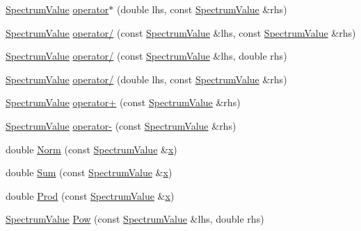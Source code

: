\begin{DoxyCompactItemize}
\hyperlink{classns3_1_1SpectrumValue}{Spectrum\+Value} \hyperlink{classns3_1_1SpectrumValue_a2dd636b84279c71ee85e995996810286}{operator$\ast$} (double lhs, const \hyperlink{classns3_1_1SpectrumValue}{Spectrum\+Value} \&rhs)
\item 
\hyperlink{classns3_1_1SpectrumValue}{Spectrum\+Value} \hyperlink{classns3_1_1SpectrumValue_a92ac3c987779b182821fd095f76c8666}{operator/} (const \hyperlink{classns3_1_1SpectrumValue}{Spectrum\+Value} \&lhs, const \hyperlink{classns3_1_1SpectrumValue}{Spectrum\+Value} \&rhs)
\item 
\hyperlink{classns3_1_1SpectrumValue}{Spectrum\+Value} \hyperlink{classns3_1_1SpectrumValue_a6186745351f66825c0bb43a963097bf4}{operator/} (const \hyperlink{classns3_1_1SpectrumValue}{Spectrum\+Value} \&lhs, double rhs)
\item 
\hyperlink{classns3_1_1SpectrumValue}{Spectrum\+Value} \hyperlink{classns3_1_1SpectrumValue_a82d8917d3c5a86202efb4f1ece6418ee}{operator/} (double lhs, const \hyperlink{classns3_1_1SpectrumValue}{Spectrum\+Value} \&rhs)
\item 
\hyperlink{classns3_1_1SpectrumValue}{Spectrum\+Value} \hyperlink{classns3_1_1SpectrumValue_a5cc1e8761ea0fff6563190882344c71b}{operator+} (const \hyperlink{classns3_1_1SpectrumValue}{Spectrum\+Value} \&rhs)
\item 
\hyperlink{classns3_1_1SpectrumValue}{Spectrum\+Value} \hyperlink{classns3_1_1SpectrumValue_a5dcbe1de844a6c958214108f08f508d7}{operator-\/} (const \hyperlink{classns3_1_1SpectrumValue}{Spectrum\+Value} \&rhs)
\item 
double \hyperlink{classns3_1_1SpectrumValue_a28ec550ea2d282c3c0c97475c39650e3}{Norm} (const \hyperlink{classns3_1_1SpectrumValue}{Spectrum\+Value} \&\hyperlink{lte__link__budget__x2__handover__measures_8m_a9336ebf25087d91c818ee6e9ec29f8c1}{x})
\item 
double \hyperlink{classns3_1_1SpectrumValue_addd3e18d3b8e0a66ab2c33b44e490aeb}{Sum} (const \hyperlink{classns3_1_1SpectrumValue}{Spectrum\+Value} \&\hyperlink{lte__link__budget__x2__handover__measures_8m_a9336ebf25087d91c818ee6e9ec29f8c1}{x})
\item 
double \hyperlink{classns3_1_1SpectrumValue_a16a9de463ea9887811a132df77f8eea0}{Prod} (const \hyperlink{classns3_1_1SpectrumValue}{Spectrum\+Value} \&\hyperlink{lte__link__budget__x2__handover__measures_8m_a9336ebf25087d91c818ee6e9ec29f8c1}{x})
\item 
\hyperlink{classns3_1_1SpectrumValue}{Spectrum\+Value} \hyperlink{classns3_1_1SpectrumValue_afcbfb5f87f3cb0ada0a3f51cbb1e134d}{Pow} (const \hyperlink{classns3_1_1SpectrumValue}{Spectrum\+Value} \&lhs, double rhs)

\end{DoxyCompactItemize}
